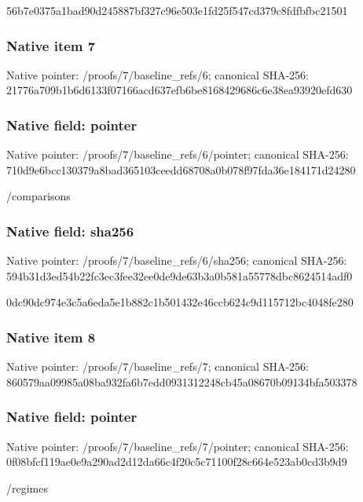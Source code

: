 \documentclass[10pt,a4paper]{article}
\begin{document}
\begingroup\raggedright\sloppy 56b7e0375a1bad90d245887bf327c96e503e1fd25f547cd379c8fdfbfbc21501\par\endgroup

\subsubsection{Native item 7}
Native pointer: /proofs/7/baseline\_\allowbreak{}refs/6; canonical SHA-256: 21776a709b1b6d6133f07166acd637efb6be8168429686c6e38ea93920efd630

\subsubsection{Native field: pointer}
Native pointer: /proofs/7/baseline\_\allowbreak{}refs/6/pointer; canonical SHA-256: 710d9e6bcc130379a8bad365103ceedd68708a0b078f97fda36e184171d24280

\begingroup\raggedright\sloppy /\allowbreak{}comparisons\par\endgroup

\subsubsection{Native field: sha256}
Native pointer: /proofs/7/baseline\_\allowbreak{}refs/6/sha256; canonical SHA-256: 594b31d3ed54b22fc3ec3fee32ee0de9de63b3a0b581a55778dbc8624514adf0

\begingroup\raggedright\sloppy 0dc90dc974e3c5a6eda5e1b882c1b501432e46ccb624c9d115712bc4048fe280\par\endgroup

\subsubsection{Native item 8}
Native pointer: /proofs/7/baseline\_\allowbreak{}refs/7; canonical SHA-256: 860579aa09985a08ba932fa6b7edd0931312248cb45a08670b09134bfa503378

\subsubsection{Native field: pointer}
Native pointer: /proofs/7/baseline\_\allowbreak{}refs/7/pointer; canonical SHA-256: 0f08bfcf119ae0e9a290ad2d12da66c4f20c5c71100f28c664e523ab0cd3b9d9

\begingroup\raggedright\sloppy /\allowbreak{}regimes\par\endgroup
\end{document}
